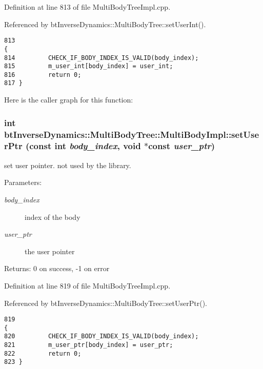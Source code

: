 Definition at line 813 of file MultiBodyTreeImpl.cpp.

Referenced by btInverseDynamics::MultiBodyTree::setUserInt().

\begin{Code}\begin{verbatim}813                                                                                    {
814         CHECK_IF_BODY_INDEX_IS_VALID(body_index);
815         m_user_int[body_index] = user_int;
816         return 0;
817 }
\end{verbatim}
\end{Code}




Here is the caller graph for this function:\hypertarget{classbt_inverse_dynamics_1_1_multi_body_tree_1_1_multi_body_impl_e3d149282a6c90ea6b0bcfe9c25066be}{
\subsubsection[setUserPtr]{\setlength{\rightskip}{0pt plus 5cm}int btInverseDynamics::MultiBodyTree::MultiBodyImpl::setUserPtr (const int {\em body\_\-index}, \/  void $\ast$const  {\em user\_\-ptr})}}
\label{classbt_inverse_dynamics_1_1_multi_body_tree_1_1_multi_body_impl_e3d149282a6c90ea6b0bcfe9c25066be}


set user pointer. not used by the library. \begin{Desc}
\item[Parameters:]
\begin{description}
\item[{\em body\_\-index}]index of the body \item[{\em user\_\-ptr}]the user pointer \end{description}
\end{Desc}
\begin{Desc}
\item[Returns:]0 on success, -1 on error \end{Desc}
 

Definition at line 819 of file MultiBodyTreeImpl.cpp.

Referenced by btInverseDynamics::MultiBodyTree::setUserPtr().

\begin{Code}\begin{verbatim}819                                                                                      {
820         CHECK_IF_BODY_INDEX_IS_VALID(body_index);
821         m_user_ptr[body_index] = user_ptr;
822         return 0;
823 }
\end{verbatim}
\end{Code}




